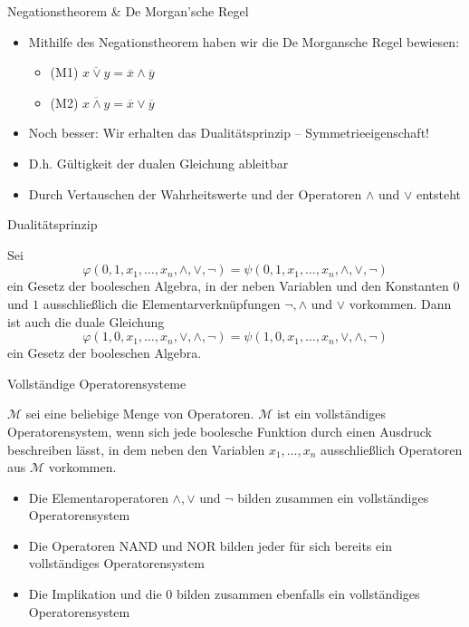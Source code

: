 \documentclass[12pt%
,aspectratio=169%
]{beamer}
\begin{document}
\begin{frame}{Negationstheorem \& De Morgan'sche Regel}
\begin{itemize}
	\item Mithilfe des Negationstheorem haben wir die De Morgansche Regel bewiesen:
	\begin{itemize}
		\item (M1) $\overline{x \lor y} = \overline{x} \land \overline{y}$
		\item (M2) $\overline{x \land y} = \overline{x} \lor \overline{y}$
	\end{itemize}
	\item Noch besser: Wir erhalten das Dualitätsprinzip -- Symmetrieeigenschaft!
	\item D.h. Gültigkeit der dualen Gleichung ableitbar
	\item Durch Vertauschen der Wahrheitswerte und der Operatoren $\land$ und $\lor$ entsteht 
\end{itemize}
\end{frame}

\begin{frame}{Dualitätsprinzip}
\begin{theorem}
Sei
$$
\varphi(0, 1, x_1 , \ldots, x_n , \land, \lor, \neg) = \psi(0, 1, x_1 , \ldots, x_n , \land, \lor, \neg)
$$
ein Gesetz der booleschen Algebra, in der neben Variablen und den Konstanten $0$ und $1$ ausschließlich die Elementarverknüpfungen $\neg, \land$ und $\lor$ vorkommen. Dann ist auch die duale Gleichung
$$
\varphi(1, 0, x_1 , \ldots, x_n , \lor, \land, \neg) = \psi(1, 0, x_1 , \ldots, x_n , \lor, \land, \neg)
$$
ein Gesetz der booleschen Algebra.
\end{theorem}
\end{frame}


\begin{frame}{Vollständige Operatorensysteme}
\begin{definition}
$\mathcal{M}$ sei eine beliebige Menge von Operatoren. $\mathcal{M}$ ist ein vollständiges Operatorensystem, wenn sich jede boolesche Funktion durch einen Ausdruck beschreiben lässt, in dem neben den Variablen $x_1 , \ldots , x_n$ ausschließlich Operatoren aus $\mathcal{M}$ vorkommen.
\end{definition}
\begin{itemize}
	\item Die Elementaroperatoren $\land, \lor$ und $\neg$ bilden zusammen ein vollständiges Operatorensystem
	\item Die Operatoren NAND und NOR bilden jeder für sich bereits ein vollständiges Operatorensystem
	\item Die Implikation und die $0$ bilden zusammen ebenfalls ein vollständiges Operatorensystem
\end{itemize}
\end{frame}
\end{document}
